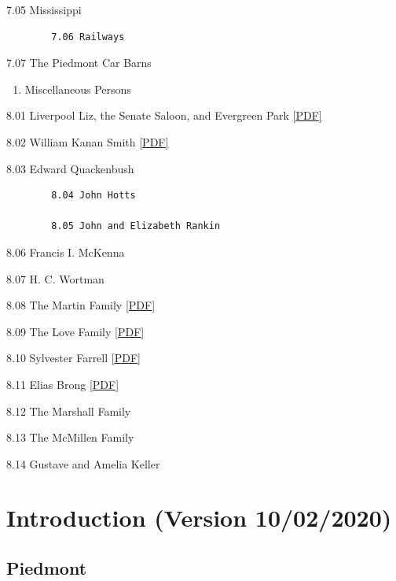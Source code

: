 \documentclass[
  12pt,
]{book}
\providecommand{\tightlist}{%
  \setlength{\itemsep}{0pt}\setlength{\parskip}{0pt}}
\begin{document}
7.05 Mississippi

\begin{verbatim}
        7.06 Railways
\end{verbatim}

7.07 The Piedmont Car Barns

\begin{enumerate}
\def\labelenumi{\arabic{enumi}.}
\setcounter{enumi}{7}
\tightlist
\item
  Miscellaneous Persons
\end{enumerate}

8.01 Liverpool Liz, the Senate Saloon, and Evergreen Park \href{https://drive.google.com/open?id=1XRryQ5xFXDOjHw9p7dL2TDQ8LO6sDVY7}{{[}PDF{]}}

8.02 William Kanan Smith \href{https://drive.google.com/open?id=11IYZqK6zaRPzNa72t1B9tkQfkhWjxb5Q}{{[}PDF{]}}

8.03 Edward Quackenbush

\begin{verbatim}
        8.04 John Hotts

        8.05 John and Elizabeth Rankin
\end{verbatim}

8.06 Francis I. McKenna

8.07 H. C. Wortman

8.08 The Martin Family \href{https://drive.google.com/open?id=1mADoFI29ftPLipamI5EpRdigcEXK-rRr}{{[}PDF{]}}

8.09 The Love Family \href{https://drive.google.com/file/d/12YJDhcY3dOTeGUjoitX8C6pLar2bG9-C}{{[}PDF{]}}

8.10 Sylvester Farrell \href{https://drive.google.com/open?id=1O9K2LZWhjggLN-gjY8EIPYTNptBFcFWn}{{[}PDF{]}}

8.11 Elias Brong \href{https://drive.google.com/open?id=1KCOXqU17d8_UfDC7sHdCaGlExHLG8tVt}{{[}PDF{]}}

8.12 The Marshall Family

8.13 The McMillen Family

8.14 Gustave and Amelia Keller

\hypertarget{introduction-version-10022020}{%
\chapter{Introduction (Version 10/02/2020)}\label{introduction-version-10022020}}

\hypertarget{piedmont}{%
\section{Piedmont}\label{piedmont}}
\end{document}
